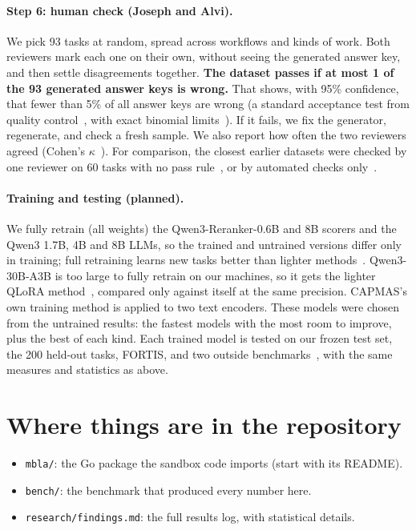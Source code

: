 \documentclass[11pt]{article}
\begin{document}
\paragraph{Step 6: human check (Joseph and Alvi).} We pick 93 tasks at random, spread across workflows and
kinds of work. Both reviewers mark each one on their own, without seeing the generated answer key, and then
settle disagreements together. \textbf{The dataset passes if at most 1 of the 93 generated answer keys is
wrong.} That shows, with 95\% confidence, that fewer than 5\% of all answer keys are wrong (a standard
acceptance test from quality control~\cite{montgomery}, with exact binomial limits~\cite{clopper}). If it fails,
we fix the generator, regenerate, and check a fresh sample. We also report how often the two reviewers agreed
(Cohen's $\kappa$~\cite{cohen}). For comparison, the closest earlier datasets were checked by one reviewer on
60 tasks with no pass rule~\cite{noyan}, or by automated checks only~\cite{apigen}.

\paragraph{Training and testing (planned).} We fully retrain (all weights) the Qwen3-Reranker-0.6B and 8B
scorers and the Qwen3 1.7B, 4B and 8B LLMs, so the trained and untrained versions differ only in training; full
retraining learns new tasks better than lighter methods~\cite{loralearnsless}. Qwen3-30B-A3B is too large to fully
retrain on our machines, so it gets the lighter QLoRA method~\cite{qlora}, compared only against itself at the same
precision. CAPMAS's own training method is applied to two text encoders. These models were chosen from the
untrained results: the fastest models with the most room to improve, plus the best of each kind. Each trained
model is tested on our frozen test set, the 200 held-out tasks, FORTIS, and two outside benchmarks~\cite{authbench,noyan},
with the same measures and statistics as above.

\section{Where things are in the repository}
\begin{itemize}
  \item \texttt{mbla/}: the Go package the sandbox code imports (start with its README).
  \item \texttt{bench/}: the benchmark that produced every number here.
  \item \texttt{research/findings.md}: the full results log, with statistical details.
\end{itemize}
\end{document}
